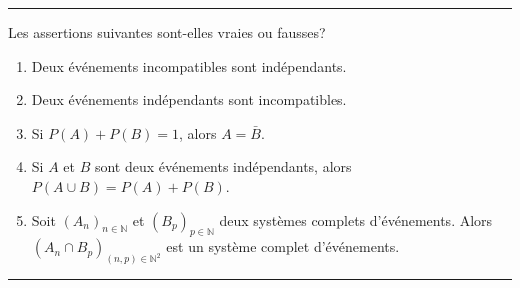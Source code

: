 \documentclass[../PolyS4.tex]{subfiles}
\begin{document}








\hfill\break
\hrule
\hfill\break


Les assertions suivantes sont-elles vraies ou fausses?\\
\begin{enumerate}
\item Deux événements incompatibles sont indépendants.
\item Deux événements indépendants sont incompatibles.
\item Si $P(A)+P(B)=1$, alors $A=\bar B$.
\item Si $A$ et $B$ sont deux événements indépendants, alors $P(A\cup B)=P(A)+P(B)$.
\item Soit $(A_n)_{n\in\mathbb N}$ et $(B_p)_{p\in\mathbb N}$ deux systèmes complets d'événements. Alors $(A_n\cap B_p)_{(n,p)\in\mathbb N^2}$ est un système complet d'événements.\\
\end{enumerate}

\hfill\break
\hrule
\hfill\break
\end{document}
